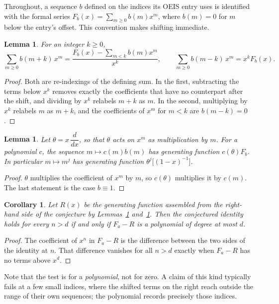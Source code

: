 \documentclass[11pt,a4paper]{article}
\theoremstyle{plain}
\newtheorem{lemma}[theorem]{Lemma}
\newtheorem{corollary}[theorem]{Corollary}
\theoremstyle{definition}
\begin{document}
Throughout, a sequence $b$ defined on the indices its OEIS entry uses is identified with
the formal series $F_{b}(x)=\sum_{m\ge0}b(m)x^{m}$, where $b(m)=0$ for $m$ below the
entry's offset. This convention makes shifting immediate.

\begin{lemma}\label{lem:shift}
For an integer $k\ge0$,
\[
\sum_{m\ge0}b(m+k)\,x^{m}=\frac{F_{b}(x)-\sum_{m<k}b(m)x^{m}}{x^{k}},
\qquad
\sum_{m\ge0}b(m-k)\,x^{m}=x^{k}F_{b}(x).
\]
\end{lemma}

\begin{proof}
Both are re-indexings of the defining sum. In the first, subtracting the terms below
$x^{k}$ removes exactly the coefficients that have no counterpart after the shift, and
dividing by $x^{k}$ relabels $m+k$ as $m$. In the second, multiplying by $x^{k}$ relabels
$m$ as $m+k$, and the coefficients of $x^{m}$ for $m<k$ are $b(m-k)=0$.
\end{proof}

\begin{lemma}\label{lem:theta}
Let $\theta=x\,\dfrac{d}{dx}$, so that $\theta$ acts on $x^{m}$ as multiplication by $m$.
For a polynomial $c$, the sequence $m\mapsto c(m)b(m)$ has generating function
$c(\theta)F_{b}$. In particular $m\mapsto m^{j}$ has generating function
$\theta^{j}\bigl[(1-x)^{-1}\bigr]$.
\end{lemma}

\begin{proof}
$\theta$ multiplies the coefficient of $x^{m}$ by $m$, so $c(\theta)$ multiplies it by
$c(m)$. The last statement is the case $b\equiv1$.
\end{proof}

\begin{corollary}\label{cor:criterion}
Let $R(x)$ be the generating function assembled from the right-hand side of the conjecture
by Lemmas~\ref{lem:shift} and~\ref{lem:theta}. Then the conjectured identity holds for
every $n>d$ if and only if $F_{a}-R$ is a polynomial of degree at most $d$.
\end{corollary}

\begin{proof}
The coefficient of $x^{n}$ in $F_{a}-R$ is the difference between the two sides of the
identity at $n$. That difference vanishes for all $n>d$ exactly when $F_{a}-R$ has no
terms above $x^{d}$.
\end{proof}

Note that the test is for a \emph{polynomial}, not for zero. A claim of this kind
typically fails at a few small indices, where the shifted terms on the right reach outside
the range of their own sequences; the polynomial records precisely those indices.
\end{document}

